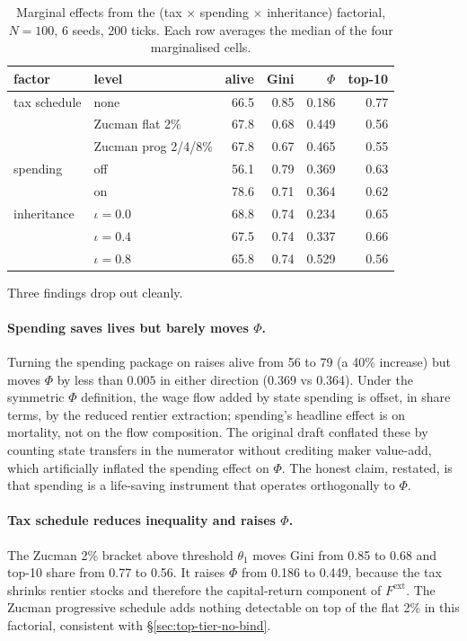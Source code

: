 \documentclass[11pt]{article}
\begin{document}
\begin{table}[t]
\centering
\small
\caption{Marginal effects from the (tax $\times$ spending $\times$
inheritance) factorial, $N=100$, 6 seeds, 200 ticks. Each row
averages the median of the four marginalised cells.}
\label{tab:factorial}
\begin{tabular}{llrrrr}
\toprule
factor & level & alive & Gini & $\Phi$ & top-10 \\
\midrule
tax schedule & none                   & 66.5 & 0.85 & 0.186 & 0.77 \\
             & Zucman flat 2\%        & 67.8 & 0.68 & 0.449 & 0.56 \\
             & Zucman prog 2/4/8\%    & 67.8 & 0.67 & 0.465 & 0.55 \\
\midrule
spending     & off                    & 56.1 & 0.79 & 0.369 & 0.63 \\
             & on                     & 78.6 & 0.71 & 0.364 & 0.62 \\
\midrule
inheritance  & $\iota = 0.0$          & 68.8 & 0.74 & 0.234 & 0.65 \\
             & $\iota = 0.4$          & 67.5 & 0.74 & 0.337 & 0.66 \\
             & $\iota = 0.8$          & 65.8 & 0.74 & 0.529 & 0.56 \\
\bottomrule
\end{tabular}
\end{table}

Three findings drop out cleanly.

\paragraph{Spending saves lives but barely moves $\Phi$.} Turning the
spending package on raises alive from 56 to 79 (a 40\% increase) but
moves $\Phi$ by less than $0.005$ in either direction (0.369 vs
0.364). Under the symmetric $\Phi$ definition, the wage flow added by
state spending is offset, in share terms, by the reduced rentier
extraction; spending's headline effect is on mortality, not on the
flow composition. The original draft conflated these by counting
state transfers in the numerator without crediting maker value-add,
which artificially inflated the spending effect on $\Phi$. The
honest claim, restated, is that spending is a life-saving instrument
that operates orthogonally to $\Phi$.

\paragraph{Tax schedule reduces inequality and raises $\Phi$.} The
Zucman 2\% bracket above threshold $\theta_1$ moves Gini from 0.85 to
0.68 and top-10 share from 0.77 to 0.56. It raises $\Phi$ from 0.186
to 0.449, because the tax shrinks rentier stocks and therefore the
capital-return component of $F^\text{ext}$. The Zucman progressive
schedule adds nothing detectable on top of the flat 2\% in this
factorial, consistent with \S\ref{sec:top-tier-no-bind}.
\end{document}
